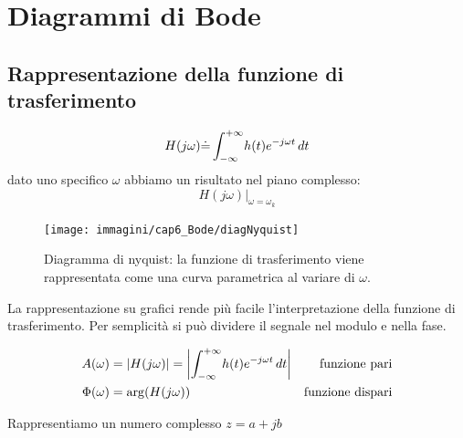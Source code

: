 \chapter{Diagrammi di Bode}
\section{Rappresentazione della funzione di trasferimento}



\begin{equation}
	H(j\omega) \dot{=}\int_{-\infty}^{+\infty} \! h(t)e^{-j\omega t} \, d t
\end{equation}
dato uno specifico $\omega$ abbiamo un risultato nel piano complesso:
\[
	H(j\omega) \big\vert_{\omega = \omega_k}
\]

\begin{figure}[H]
	\centering
	\texttt{[image: immagini/cap6\_Bode/diagNyquist]}
	\caption{ Diagramma di nyquist: la funzione di trasferimento viene rappresentata come una curva parametrica al variare di $\omega$.  }
	\label{fig:diagNyquist}
\end{figure}

La rappresentazione su grafici rende più facile l'interpretazione della funzione di trasferimento. Per semplicità si può dividere il segnale nel modulo e nella fase.

\begin{equation*}
\begin{align}
 A(\omega)&=\abs{H(j\omega)}=\Abs{\int_{-\infty}^{+\infty} \! h(t)e^{-j\omega t} \d t} &\text{funzione pari}\\	
 \Phi (\omega)&= \arg(H(j\omega)) & \text{funzione dispari}
\end{align}
\end{equation*}

Rappresentiamo un numero complesso $z=a+jb$

